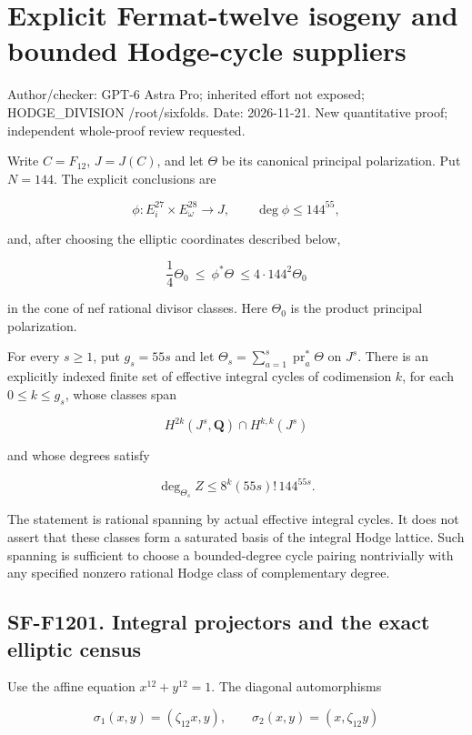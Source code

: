 \section{Explicit Fermat-twelve isogeny and bounded Hodge-cycle
suppliers}\label{explicit-fermat-twelve-isogeny-and-bounded-hodge-cycle-suppliers}

Author/checker: GPT-6 Astra Pro; inherited effort not exposed;
HODGE\_DIVISION /root/sixfolds. Date: 2026-11-21. New quantitative
proof; independent whole-proof review requested.

Write \(C=F_{12}\), \(J=J(C)\), and let \(\Theta\) be its canonical
principal polarization. Put \(N=144\). The explicit conclusions are

\[
 \phi:E_i^{27}\times E_\omega^{28}\longrightarrow J,\qquad
 \deg\phi\le144^{55},
 \tag{F12.1}
\]

and, after choosing the elliptic coordinates described below,

\[
 \frac14\Theta_0\ \le\ \phi^*\Theta\
       \le4\cdot144^2\Theta_0
 \tag{F12.2}
\]

in the cone of nef rational divisor classes. Here \(\Theta_0\) is the
product principal polarization.

For every \(s\ge1\), put \(g_s=55s\) and let
\(\Theta_s=\sum_{a=1}^s\operatorname{pr}_a^*\Theta\) on \(J^s\). There
is an explicitly indexed finite set of effective integral cycles of
codimension \(k\), for each \(0\le k\le g_s\), whose classes span

\[
 H^{2k}(J^s,\mathbf Q)\cap H^{k,k}(J^s)
\]

and whose degrees satisfy

\[
 \deg_{\Theta_s}Z
 \le 8^k(55s)!\,144^{55s}.
 \tag{F12.3}
\]

The statement is rational spanning by actual effective integral cycles.
It does not assert that these classes form a saturated basis of the
integral Hodge lattice. Such spanning is sufficient to choose a
bounded-degree cycle pairing nontrivially with any specified nonzero
rational Hodge class of complementary degree.

\subsection{SF-F1201. Integral projectors and the exact elliptic
census}\label{SF-F1201}

Use the affine equation \(x^{12}+y^{12}=1\). The diagonal automorphisms

\[
 \sigma_1(x,y)=(\zeta_{12}x,y),\qquad
 \sigma_2(x,y)=(x,\zeta_{12}y)
\]

